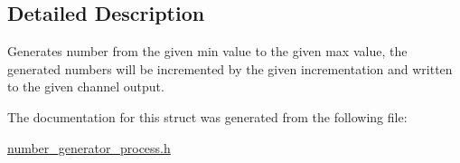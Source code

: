 \subsection{Detailed Description}
Generates number from the given min value to the given max value, the generated numbers will be incremented by the given incrementation and written to the given channel output. 

The documentation for this struct was generated from the following file\-:\begin{DoxyCompactItemize}
\item 
\hyperlink{number__generator__process_8h}{number\-\_\-generator\-\_\-process.\-h}\end{DoxyCompactItemize}
